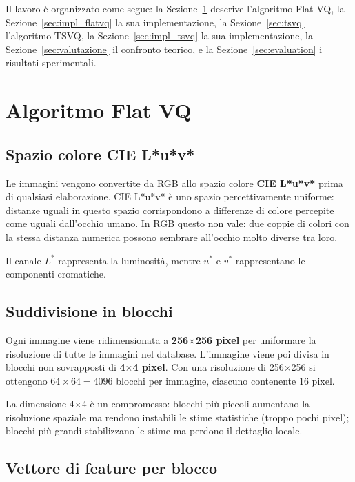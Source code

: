 \documentclass[12pt, a4paper]{article}
\begin{document}
Il lavoro è organizzato come segue: la Sezione~\ref{sec:flatvq} descrive l'algoritmo Flat VQ,
la Sezione~\ref{sec:impl_flatvq} la sua implementazione, la Sezione~\ref{sec:tsvq} l'algoritmo
TSVQ, la Sezione~\ref{sec:impl_tsvq} la sua implementazione, la Sezione~\ref{sec:valutazione}
il confronto teorico, e la Sezione~\ref{sec:evaluation} i risultati sperimentali.

\section{Algoritmo Flat VQ}
\label{sec:flatvq}

\subsection{Spazio colore CIE L*u*v*}

Le immagini vengono convertite da RGB allo spazio colore \textbf{CIE L*u*v*} prima di
qualsiasi elaborazione. CIE L*u*v* è uno spazio percettivamente uniforme: distanze uguali
in questo spazio corrispondono a differenze di colore percepite come uguali dall'occhio
umano. In RGB questo non vale: due coppie di colori con la stessa distanza numerica possono
sembrare all'occhio molto diverse tra loro.

Il canale $L^*$ rappresenta la luminosità, mentre $u^*$ e $v^*$ rappresentano le componenti
cromatiche.

\subsection{Suddivisione in blocchi}

Ogni immagine viene ridimensionata a \textbf{256$\times$256 pixel} per uniformare la
risoluzione di tutte le immagini nel database. L'immagine viene poi divisa in blocchi
non sovrapposti di \textbf{4$\times$4 pixel}. Con una risoluzione di 256$\times$256 si
ottengono $64 \times 64 = 4096$ blocchi per immagine, ciascuno contenente 16 pixel.

La dimensione 4$\times$4 è un compromesso: blocchi più piccoli aumentano la risoluzione
spaziale ma rendono instabili le stime statistiche (troppo pochi pixel); blocchi più grandi
stabilizzano le stime ma perdono il dettaglio locale.

\subsection{Vettore di feature per blocco}
\end{document}

